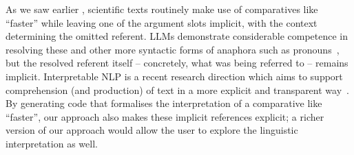As we saw earlier , scientific texts routinely make use of comparatives like ``faster'' while
leaving one of the argument slots implicit, with the context determining the omitted referent. LLMs
demonstrate considerable competence in resolving these and other more syntactic forms of anaphora such as
pronouns~\citep{zhu25}, but the resolved referent itself -- concretely, what was being referred to -- remains
implicit. Interpretable NLP is a recent research direction which aims to support comprehension (and
production) of text in a more explicit and transparent way~\citep{yulan23}. By generating code that formalises
the interpretation of a comparative like ``faster'', our approach also makes these implicit references
explicit; a richer version of our approach would allow the user to explore the linguistic interpretation as
well. 
